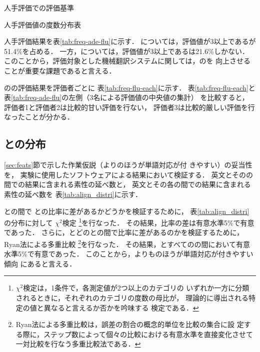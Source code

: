 \documentclass[japanese]{jnlp_1.4}
\newcommand{\AL}{}
\newcommand{\NAL}{}
\newcommand{\align}{}
\newcommand{\ADE}{}
\newcommand{\FLU}{}
\newcommand{\HUM}{}
\newcommand{\MT}{}
\begin{document}
\begin{table}[b]
\caption{人手評価での評価基準}
\label{tab:ade-flu}

\end{table}
\begin{table}[b]
\caption{人手評価値の度数分布表}
\label{tab:freq-ade-flu}

\end{table}


人手評価結果を表\ref{tab:freq-ade-flu}に示す．
{\ADE}については，評価値が3以上である{\MT}が51.4\%を占める．
一方，{\FLU}については，評価値が3以上である{\MT}は21.6\%しかない．
このことから，評価対象とした機械翻訳システムに関しては，{\MT}の{\FLU}を
向上させることが重要な課題であると言える．




{\MT}の{\FLU}の評価結果を評価者ごとに
表\ref{tab:freq-flu-each}に示す．
表\ref{tab:freq-flu-each}と
表\ref{tab:freq-ade-flu}の左側（3名による評価値の中央値の集計）
を比較すると，
評価者1と評価者2は比較的甘い評価を行ない，
評価者3は比較的厳しい評価を行なったことが分かる．



\subsection{{\AL}と{\NAL}の分布}
\label{sec:experiment:align_distri}

\ref{sec:feats}節で示した作業仮説（{\HUM}より{\MT}のほうが単語対応が付
きやすい）の妥当性を，
実験に使用したソフトウェアによる{\align}結果において検証する．
英文とその{\HUM}の間での{\align}結果に含まれる素性の延べ数と，
英文とその各{\MT}の間での{\align}結果に含まれる素性の延べ数を
表\ref{tab:align_distri}に示す．

{\HUM}と{\MT}の間で
{\AL}と{\NAL}の比率に差があるかどうかを検証するために，
表\ref{tab:align_distri}の分布に対して
$\chi^2$検定
\footnote{$\chi^2$検定は，1条件で，各測定値が2つ以上のカテゴリの
いずれか一方に分類されるときに，それぞれのカテゴリの度数の母比が，
理論的に導出される特定の値と異なると言えるか否かを吟味する
検定である\cite{Mori06}．}を行なった．
その結果，比率の差は有意水準5\%で有意であった．
さらに，{\HUM}とどの{\MT}との間で比率に差があるのかを検証するために，
Ryan法による多重比較
\footnote{Ryan法による多重比較は，誤差の割合の概念的単位を比較の集合に設
定する際に，ステップ数によって個々の比較における有意水準を直接変化させて
一対比較を行なう多重比較法である\cite{Mori06}．}を行なった．
その結果，{\HUM}とすべての{\MT}の間において有意水準5\%で有意であった．
このことから，{\HUM}よりも{\MT}のほうが単語対応が付きやすい傾向
にあると言える．
\end{document}
